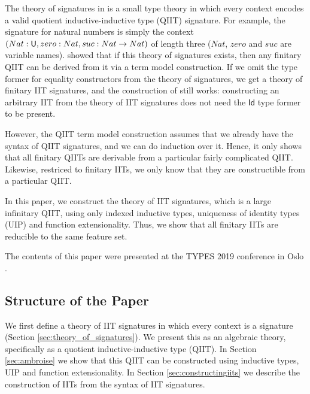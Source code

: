 \documentclass[a4paper,UKenglish,cleveref, autoref]{lipics-v2019}
\begin{document}
The theory of signatures in \cite{Kaposi:2019:CQI:3302515.3290315} is a small
type theory in which every context encodes a valid quotient inductive-inductive
type (QIIT) signature. For example, the signature for natural numbers is simply
the context $(Nat:\mathsf{U},zero:Nat,suc:Nat\rightarrow Nat)$ of length three ($Nat$, $zero$
and $suc$ are variable names). \cite{Kaposi:2019:CQI:3302515.3290315} showed
that if this theory of signatures exists, then any finitary QIIT can be derived
from it via a term model construction. If we omit the type former for equality
constructors from the theory of signatures, we get a theory of finitary IIT
signatures, and the construction of \cite{Kaposi:2019:CQI:3302515.3290315} still
works: constructing an arbitrary IIT from the theory of IIT signatures does not
need the $\mathsf{Id}$ type former to be present.

However, the QIIT term model construction assumes that we already have the
syntax of QIIT signatures, and we can do induction over it. Hence, it only shows
that all finitary QIITs are derivable from a particular fairly complicated QIIT.
Likewise, restriced to finitary IITs, we only know that they are constructible
from a particular QIIT.

In this paper, we construct the theory of IIT signatures, which is a large
infinitary QIIT, using only indexed inductive types, uniqueness of identity
types (UIP) and function extensionality. Thus, we show that all finitary IITs are
reducible to the same feature set.

The contents of this paper were presented at the TYPES 2019 conference
in Oslo \cite{types}.

\subsection{Structure of the Paper}

We first define a theory of IIT signatures in which every context is a signature
(Section \ref{sec:theory_of_signatures}). We present this as an algebraic
\cite{ttintt} theory, specifically as a quotient inductive-inductive type
(QIIT). In Section \ref{sec:ambroise} we show that this QIIT can be constructed
using inductive types, UIP and function extensionality. In Section
\ref{sec:constructingiits} we describe the construction of IITs from the syntax
of IIT signatures.


\end{document}
